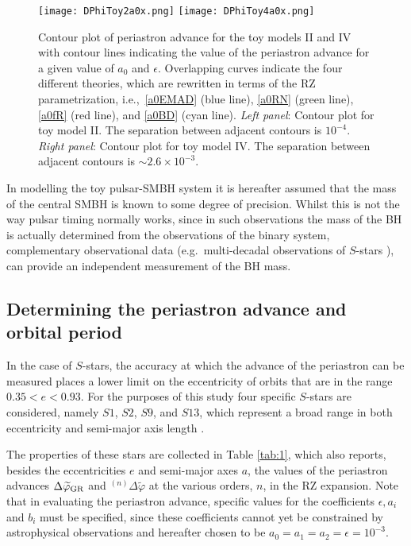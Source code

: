 \documentclass[a4paper,aps,twocolumn,showpacs,showkeys,nofootinbib,preprintnumbers,superscriptaddress,amsmath,amssymb,amsfonts]{revtex4-1}
\newcommand{\ie}{{i.e.,}~}
\begin{document}
\begin{figure*}
\texttt{[image: DPhiToy2a0x.png]} 
\texttt{[image: DPhiToy4a0x.png]} 
\caption{Contour plot of periastron advance for the toy models II and IV
  with contour lines indicating the value of the periastron advance for a
  given value of $a_0$ and $\epsilon$. Overlapping curves indicate the
  four different theories, which are rewritten in terms of the RZ
  parametrization, \ie \eqref{a0EMAD} (blue line), \eqref{a0RN} (green
  line), \eqref{a0fR} (red line), and \eqref{a0BD} (cyan
  line). \textit{Left panel}: Contour plot for toy model II. The
  separation between adjacent contours is
  $10^{-4}$. \textit{Right panel}: Contour plot for toy model IV. The
  separation between adjacent contours is $\sim 2.6 \times 10^{-3}$.}
\label{fig:1}
\end{figure*}

In modelling the toy pulsar-SMBH system it is hereafter assumed that
the mass of the central SMBH is known to some degree of precision. 
Whilst this is not the way pulsar timing normally works, 
since in such observations the mass of the BH is actually determined
from the observations of the binary system,
complementary observational data
(e.g.~multi-decadal observations of $S$-stars \cite{Boehle2016}), 
can provide an independent measurement of the BH mass.


\subsection{Determining the periastron advance and orbital period}
\label{sei.uno}
In the case of $S$-stars, the accuracy at which the advance of the
periastron can be measured places a lower limit on the eccentricity of
orbits that are in the range $0.35< e <0.93$.
For the purposes of this study four specific $S$-stars are considered,
namely $S1$, $S2$, $S9$, and $S13$, which represent a broad range in
both eccentricity and semi-major axis length 
\cite{Eckart1996, Eckart1997, Gillessen:2009, 
Gillessen2009L, Ghez1998, Ghez:2008}.

The properties of
these stars are collected in Table \ref{tab:1}, which also reports, besides
the eccentricities $e$ and semi-major axes $a$, the values of the
periastron advances $\Delta\widetilde{\varphi}_{\rm GR}$ and ${}^{(n)}\Delta\widetilde{\varphi}$
at the various orders, $n$, in the RZ expansion. Note that in evaluating the
periastron advance, specific values for the coefficients $\epsilon, a_i$ and $b_i$ must 
be specified, since these coefficients cannot yet be
constrained by astrophysical observations and 
hereafter chosen to be $a_0=a_1=a_2=\epsilon=10^{-3}$. 
\end{document}
